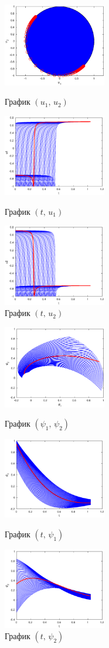 \documentclass[11pt]{article}
\begin{document}
\begin{figure}[h]
\begin{multicols}{3}
	\hfill
	\includegraphics[width=45mm]{2uu.eps}
	\hfill
	\caption{График $(u_1, \, u_2)$}
	\hfill
	\includegraphics[width=45mm]{2tu1.eps}
	\hfill
	\caption{График $(t, \, u_1)$}
    \hfill
	\includegraphics[width=45mm]{2tu2.eps}
	\hfill
	\caption{График $(t, \, u_2)$}
\end{multicols}
\end{figure}		


\begin{figure}[h]
\begin{multicols}{3}
	\hfill
	\includegraphics[width=45mm]{2pp.eps}
	\hfill
	\caption{График $(\psi_1, \, \psi_2)$}
	\hfill
	\includegraphics[width=45mm]{2tp1.eps}
	\hfill
	\caption{График $(t, \, \psi_1)$}
    \hfill
	\includegraphics[width=45mm]{2tp2.eps}
	\hfill
	\caption{График $(t, \, \psi_2)$}
\end{multicols}
\end{figure}	
\end{document}
